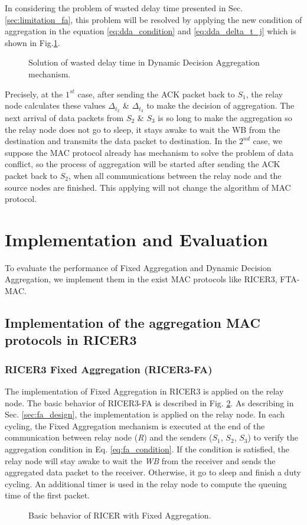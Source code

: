 In considering the problem of wasted delay time presented in Sec. \ref{sec:limitation_fa}, this problem will be resolved by applying the new condition of aggregation in the equation \ref{eq:dda_condition} and \ref{eq:dda_delta_t_j} which is shown in Fig.\ref{fig:dda_2}.
\begin{figure}[!b]
\begin{center}
\caption{Solution of wasted delay time in Dynamic Decision Aggregation mechanism.}
\label{fig:dda_2}
\end{center}
\end{figure}
Precisely, at the $1^{st}$ case, after sending the ACK packet back to $S_1$, the relay node calculates these values $\Delta_{t_2}$ \& $\Delta_{t_3}$ to make the decision of aggregation. The next arrival of data packets from $S_2$ \& $S_3$ is so long to make the aggregation so the relay node does not go to sleep, it stays awake to wait the WB from the destination and transmits the data packet to destination. In the $2^{nd}$ case, we suppose the MAC protocol already has mechanism to solve the problem of data conflict, so the process of aggregation will be started after sending the ACK packet back to $S_2$, when all communications between the relay node and the source nodes are finished. This applying will not change the algorithm of MAC protocol. 
\section{Implementation and Evaluation}
To evaluate the performance of Fixed Aggregation and Dynamic Decision Aggregation, we implement them in the exist MAC protocols like RICER3, FTA-MAC.
\subsection{Implementation of the aggregation MAC protocols in RICER3}
\subsubsection{RICER3 Fixed Aggregation (RICER3-FA)}
The implementation of Fixed Aggregation in RICER3 is applied on the relay node.
The basic behavior of RICER3-FA is described in Fig. \ref{fig:ricer_fa}. As describing in Sec. \ref{sec:fa_design}, the implementation is applied on the relay node. In each cycling, the Fixed Aggregation mechanism is executed at the end of the communication between relay node (\textit{R}) and the senders ($S_1$, $S_2$, $S_3$) to verify the aggregation condition in Eq. \ref{eq:fa_condition}. If the condition is satisfied, the relay node will stay awake to wait the \textit{WB} from the receiver and sends the aggregated data packet to the receiver. Otherwise, it go to sleep and finish a duty cycling. An additional timer is used in the relay node to compute the queuing time of the first packet.
\begin{figure}[!b]
\begin{center}
\caption{Basic behavior of RICER with Fixed Aggregation.}
\label{fig:ricer_fa}
\end{center}
\end{figure}
